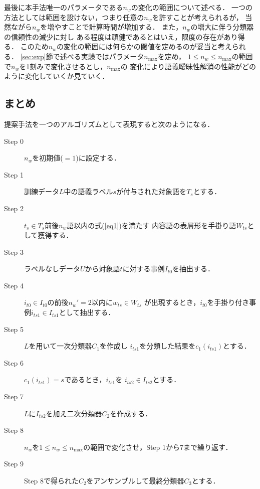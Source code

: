 \documentclass[japanese]{jnlp_1.4}
\begin{document}
最後に本手法唯一のパラメータである$n_w$の変化の範囲について述べる．
一つの方法としては範囲を設けない，つまり任意の$n_w$を許すことが考えられるが，
当然ながら$n_w$を増やすことで計算時間が増加する．
また，$n_w$の増大に伴う分類器の信頼性の減少に対し
ある程度は頑健であるとはいえ，限度の存在があり得る．
このため$n_w$の変化の範囲には何らかの閾値を定めるのが妥当と考えられる．
\ref{sec:exp}節で述べる実験ではパラメータ$n_{\max}$を定め，
$1 \leq n_w \leq n_{\max}$の範囲で$n_w$を1刻みで変化させるとし，$n_{\max}$の
変化により語義曖昧性解消の性能がどのように変化していくか見ていく．


\subsection{まとめ}
\label{sec:summary}

提案手法を一つのアルゴリズムとして表現すると次のようになる．

\vspace{0.5\baselineskip}
\begin{center}
\begin{minipage}{0.85\hsize}
\begin{description}
\item[Step 0] $n_w$を初期値($=1$)に設定する．
\item[Step 1] 訓練データ$L$中の語義ラベル$s$が付与された対象語を$T_s$とする．
\item[Step 2] $t_s \in T_s$前後$n_w$語以内の式(\ref{eq1})を満たす
内容語の表層形を手掛り語$W_{ts}$として獲得する．
\item[Step 3] ラベルなしデータ$U$から対象語$t$に対する事例$I_{t0}$を抽出する．
\item[Step 4] $i_{t0} \in I_{t0}$の前後$n_w'=2$以内に$w_{ts} \in W_{ts}$
が出現するとき，$i_{t0}$を手掛り付き事例$i_{ts1} \in I_{ts1}$として抽出する．
\item[Step 5] $L$を用いて一次分類器$C_1$を作成し
$i_{ts1}$を分類した結果を$c_1(i_{ts1})$とする．
\item[Step 6] $c_1(i_{ts1})=s$であるとき，$i_{ts1}$を
$i_{ts2} \in I_{ts2}$とする．
\item[Step 7] $L$に$I_{ts2}$を加え二次分類器$C_2$を作成する．
\item[Step 8] $n_w$を$1 \leq n_w \leq n_{\max}$の範囲で変化させ，Step 1から7まで繰り返す．
\item[Step 9] Step 8で得られた$C_2$をアンサンブルして最終分類器$C_3$とする．
\end{description}
\end{minipage}
\end{center}
\vspace{0.5\baselineskip}
\end{document}
